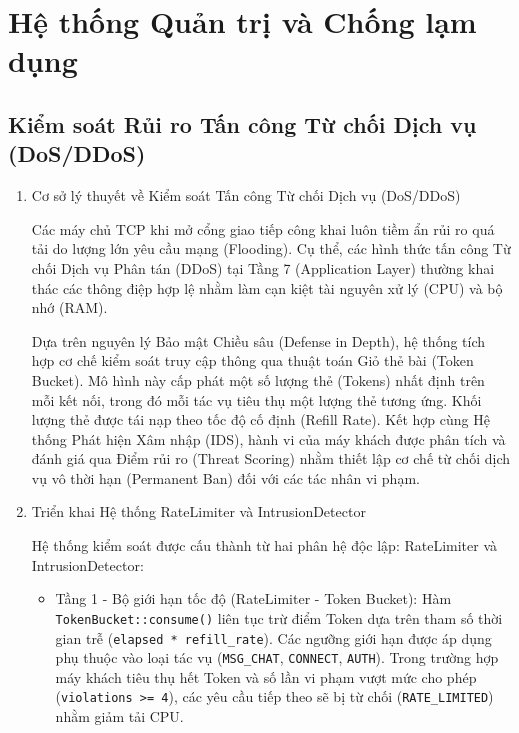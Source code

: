 \section{Hệ thống Quản trị và Chống lạm dụng}

\subsection{Kiểm soát Rủi ro Tấn công Từ chối Dịch vụ (DoS/DDoS)}

\begin{enumerate}
    \item Cơ sở lý thuyết về Kiểm soát Tấn công Từ chối Dịch vụ (DoS/DDoS)
    
    Các máy chủ TCP khi mở cổng giao tiếp công khai luôn tiềm ẩn rủi ro quá tải do lượng lớn yêu cầu mạng (Flooding). Cụ thể, các hình thức tấn công Từ chối Dịch vụ Phân tán (DDoS) tại Tầng 7 (Application Layer) thường khai thác các thông điệp hợp lệ nhằm làm cạn kiệt tài nguyên xử lý (CPU) và bộ nhớ (RAM).
    
    Dựa trên nguyên lý Bảo mật Chiều sâu (Defense in Depth), hệ thống tích hợp cơ chế kiểm soát truy cập thông qua thuật toán Giỏ thẻ bài (Token Bucket). Mô hình này cấp phát một số lượng thẻ (Tokens) nhất định trên mỗi kết nối, trong đó mỗi tác vụ tiêu thụ một lượng thẻ tương ứng. Khối lượng thẻ được tái nạp theo tốc độ cố định (Refill Rate). Kết hợp cùng Hệ thống Phát hiện Xâm nhập (IDS), hành vi của máy khách được phân tích và đánh giá qua Điểm rủi ro (Threat Scoring) nhằm thiết lập cơ chế từ chối dịch vụ vô thời hạn (Permanent Ban) đối với các tác nhân vi phạm.

    \item Triển khai Hệ thống RateLimiter và IntrusionDetector
    
    Hệ thống kiểm soát được cấu thành từ hai phân hệ độc lập: RateLimiter và IntrusionDetector:
    
    \begin{itemize}[label={-}]
        \item Tầng 1 - Bộ giới hạn tốc độ (RateLimiter - Token Bucket): Hàm \texttt{TokenBucket::}\allowbreak\texttt{consume()} liên tục trừ điểm Token dựa trên tham số thời gian trễ (\texttt{elapsed * refill\_rate}). Các ngưỡng giới hạn được áp dụng phụ thuộc vào loại tác vụ (\texttt{MSG\_CHAT}, \texttt{CONNECT}, \texttt{AUTH}). Trong trường hợp máy khách tiêu thụ hết Token và số lần vi phạm vượt mức cho phép (\texttt{violations >= 4}), các yêu cầu tiếp theo sẽ bị từ chối (\texttt{RATE\_LIMITED}) nhằm giảm tải CPU.
        

\end{itemize}
\end{enumerate}
